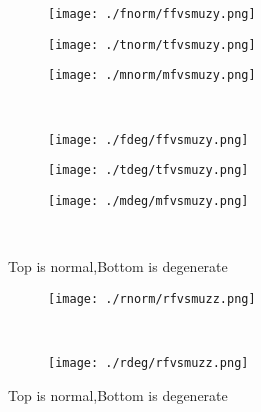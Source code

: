 \documentclass[aps,floats,floatfix,nofootinbib]{revtex4-1}
\begin{document}
\begin{center}
\begin{figure}
\begin{subfigure}{0.3\textwidth}
\texttt{[image: ./fnorm/ffvsmuzy.png]}
\label{}
\end{subfigure}
\begin{subfigure}{0.3\textwidth}
\texttt{[image: ./tnorm/tfvsmuzy.png]}
\label{}
\end{subfigure}
\begin{subfigure}{0.3\textwidth}
\texttt{[image: ./mnorm/mfvsmuzy.png]}
\label{}
\end{subfigure}\\
\begin{subfigure}{0.3\textwidth}
\texttt{[image: ./fdeg/ffvsmuzy.png]}
\label{}
\end{subfigure}
\begin{subfigure}{0.3\textwidth}
\texttt{[image: ./tdeg/tfvsmuzy.png]}
\label{}
\end{subfigure}
\begin{subfigure}{0.3\textwidth}
\texttt{[image: ./mdeg/mfvsmuzy.png]}
\label{}
\end{subfigure}\\
\caption{Top is normal,Bottom is degenerate}
\end{figure}
\end{center}

\begin{center}
\begin{figure}
\begin{subfigure}{0.95\textwidth}
\texttt{[image: ./rnorm/rfvsmuzz.png]}
\label{}
\end{subfigure}\\
\begin{subfigure}{0.95\textwidth}
\texttt{[image: ./rdeg/rfvsmuzz.png]}
\label{}
\end{subfigure}
\caption{Top is normal,Bottom is degenerate}
\end{figure}
\end{center}
\end{document}
